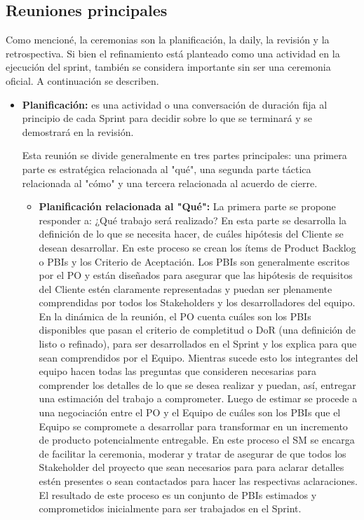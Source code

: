 \subsection{Reuniones principales}

Como mencioné, la ceremonias son la planificación, la daily, la revisión y la retrospectiva. Si bien el refinamiento está planteado como una actividad en la ejecución del sprint, también se considera importante sin ser una ceremonia oficial. A continuación se describen.

\begin{itemize}

\item \textbf{Planificación:} es una actividad o una conversación de duración fija al principio de cada Sprint para decidir sobre lo que se terminará y se demostrará en la revisión.

Esta reunión se divide generalmente en tres partes principales: una primera parte es estratégica relacionada al "qué", una segunda parte táctica relacionada al "cómo" y una tercera relacionada al acuerdo de cierre. 

\begin{itemize}

\item \textbf{Planificación relacionada al "Qué":} La primera parte se propone responder a: ¿Qué trabajo será realizado? En esta parte se desarrolla la definición de lo que se necesita hacer, de cuáles hipótesis del Cliente se desean desarrollar. En este proceso se crean los ítems de Product Backlog o PBIs y los Criterio de Aceptación. Los PBIs son generalmente escritos por el PO y están diseñados para asegurar que las hipótesis de requisitos del Cliente estén claramente representadas y puedan ser plenamente comprendidas por todos los Stakeholders y los desarrolladores del equipo.
En la dinámica de la reunión, el PO cuenta cuáles son los PBIs disponibles que pasan el criterio de completitud o DoR (una definición de listo o refinado), para ser desarrollados en el Sprint y los explica para que sean comprendidos por el Equipo. Mientras sucede esto los integrantes del equipo hacen todas las preguntas que consideren necesarias para comprender los detalles de lo que se desea realizar y puedan, así, entregar una estimación del trabajo a comprometer. Luego de estimar se procede a una negociación entre el PO y el Equipo de cuáles son los PBIs que el Equipo se compromete a desarrollar para transformar en un incremento de producto potencialmente entregable. En este proceso el SM se encarga de facilitar la ceremonia, moderar y tratar de asegurar de que todos los Stakeholder del proyecto que sean necesarios para para aclarar detalles estén presentes o sean contactados para hacer las respectivas aclaraciones.
El resultado de este proceso es un conjunto de PBIs estimados y comprometidos inicialmente para ser trabajados en el Sprint.


\end{itemize}
\end{itemize}
